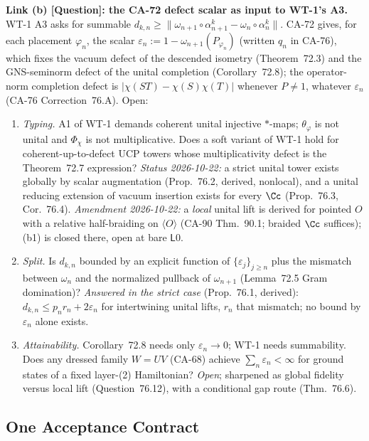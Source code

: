 \textbf{Link (b) [Question]: the CA-72 defect scalar as input to WT-1's A3.} WT-1 A3 asks for summable
\(d_{k,n}\ge \|\omega_{n+1}\circ\alpha^k_{n+1}-\omega_n\circ\alpha^k_n\|\).  CA-72 gives, for each
placement \(\varphi_n\), the scalar \(\varepsilon_n:=1-\omega_{n+1}(P_{\varphi_n})\) (written \(q_n\) in
CA-76), which fixes the vacuum defect of the descended isometry (Theorem~72.3) and the GNS-seminorm
defect of the unital completion (Corollary~72.8); the operator-norm completion defect is
\(|\chi(ST)-\chi(S)\chi(T)|\) whenever \(P\neq1\), whatever \(\varepsilon_n\) (CA-76 Correction~76.A).
Open:
\begin{enumerate}
\item[(b1)] \emph{Typing.}  A1 of WT-1 demands coherent unital injective \(*\)-maps; \(\theta_\varphi\)
is not unital and \(\Phi_\chi\) is not multiplicative.  Does a soft variant of WT-1 hold for
coherent-up-to-defect UCP towers whose multiplicativity defect is the Theorem~72.7 expression?
\emph{Status 2026-10-22:} a strict unital tower exists globally by scalar augmentation (Prop.~76.2,
derived, nonlocal), and a unital reducing extension of vacuum insertion exists for every \(\Cc\)
(Prop.~76.3, Cor.~76.4).  \emph{Amendment 2026-10-22:} a \emph{local} unital lift is derived for pointed \(O\) with a relative
half-braiding on \(\langle O\rangle\) (CA-90 Thm.~90.1; braided \(\Cc\) suffices); (b1) is closed there, open at bare \(\mathsf L0\).
\item[(b2)] \emph{Split.}  Is \(d_{k,n}\) bounded by an explicit function of \(\{\varepsilon_j\}_{j\ge
n}\) plus the mismatch between \(\omega_n\) and the normalized pullback of \(\omega_{n+1}\) (Lemma~72.5
Gram domination)? \emph{Answered in the strict case} (Prop.~76.1, derived): \(d_{k,n}\le
p_nr_n+2\varepsilon_n\) for intertwining unital lifts, \(r_n\) that mismatch; no bound by \(\varepsilon_n\) alone exists.
\item[(b3)] \emph{Attainability.}  Corollary~72.8 needs only \(\varepsilon_n\to0\); WT-1 needs
summability.  Does any dressed family \(W=UV\) (CA-68) achieve \(\sum_n\varepsilon_n<\infty\) for ground
states of a fixed layer-(2) Hamiltonian?  \emph{Open}; sharpened as global fidelity versus local lift
(Question~76.12), with a conditional gap route (Thm.~76.6).
\end{enumerate}

\subsection{One Acceptance Contract}

